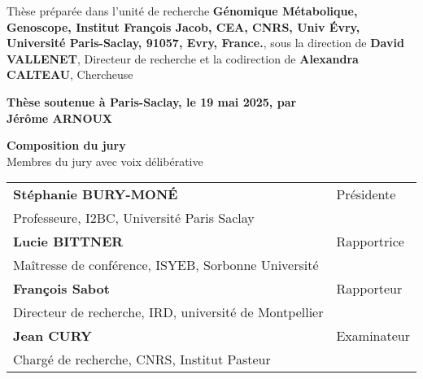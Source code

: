 \begin{titlepage}
\footnotesize Thèse préparée dans l'unité de recherche \textbf{Génomique Métabolique, Genoscope, Institut François Jacob, CEA, CNRS, Univ Évry, Université Paris-Saclay, 91057, Evry, France.}, sous la direction de \textbf{David VALLENET}, Directeur de recherche et la codirection de \textbf{Alexandra CALTEAU}, Chercheuse\\
\vspace{15mm}

\textbf{Thèse soutenue à Paris-Saclay, le 19 mai 2025, par}\\
\bigskip
\Large {\color{Prune} \textbf{Jérôme ARNOUX}} %

\vspace{\fill} %

\bigskip

\flushleft
\small {\color{Prune} \textbf{Composition du jury}}\\
{\color{Prune} \scriptsize {Membres du jury avec voix délibérative}} \\
\vspace{2mm}
\scriptsize
\begin{tabular}{|p{7cm}l}
\arrayrulecolor{Prune}
\textbf{Stéphanie BURY-MONÉ} & Présidente\\ 
Professeure, I2BC, Université Paris Saclay & \\
\textbf{Lucie BITTNER} &  Rapportrice \\ 
Maîtresse de conférence, ISYEB, Sorbonne Université   &   \\ 
\textbf{François Sabot} &  Rapporteur \\ 
Directeur de recherche, IRD, université de Montpellier  &   \\ 
\textbf{Jean CURY} &  Examinateur \\ 
Chargé de recherche, CNRS, Institut Pasteur &   \\
\end{tabular} 

\end{titlepage}